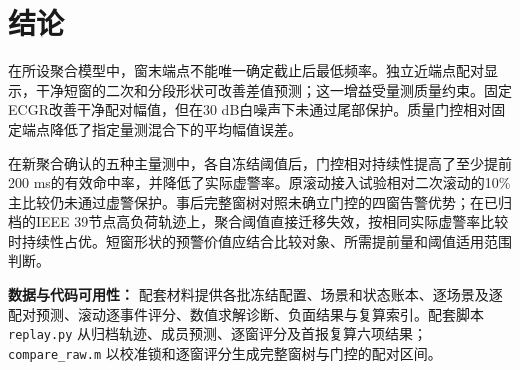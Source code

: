 \documentclass[UTF8,a4paper,11pt]{ctexart}
\begin{document}
\section{结论}
在所设聚合模型中，窗末端点不能唯一确定截止后最低频率。独立近端点配对显示，干净短窗的二次和分段形状可改善差值预测；这一增益受量测质量约束。固定ECGR改善干净配对幅值，但在30 dB白噪声下未通过尾部保护。质量门控相对固定端点降低了指定量测混合下的平均幅值误差。

在新聚合确认的五种主量测中，各自冻结阈值后，门控相对持续性提高了至少提前200 ms的有效命中率，并降低了实际虚警率。原滚动接入试验相对二次滚动的10\%主比较仍未通过虚警保护。事后完整窗树对照未确立门控的四窗告警优势；在已归档的IEEE 39节点高负荷轨迹上，聚合阈值直接迁移失效，按相同实际虚警率比较时持续性占优。短窗形状的预警价值应结合比较对象、所需提前量和阈值适用范围判断。

\noindent\textbf{数据与代码可用性：} 配套材料提供各批冻结配置、场景和状态账本、逐场景及逐配对预测、滚动逐事件评分、数值求解诊断、负面结果与复算索引。配套脚本 \texttt{replay.py} 从归档轨迹、成员预测、逐窗评分及首报复算六项结果；\texttt{compare\_raw.m} 以校准锁和逐窗评分生成完整窗树与门控的配对区间。
\end{document}
